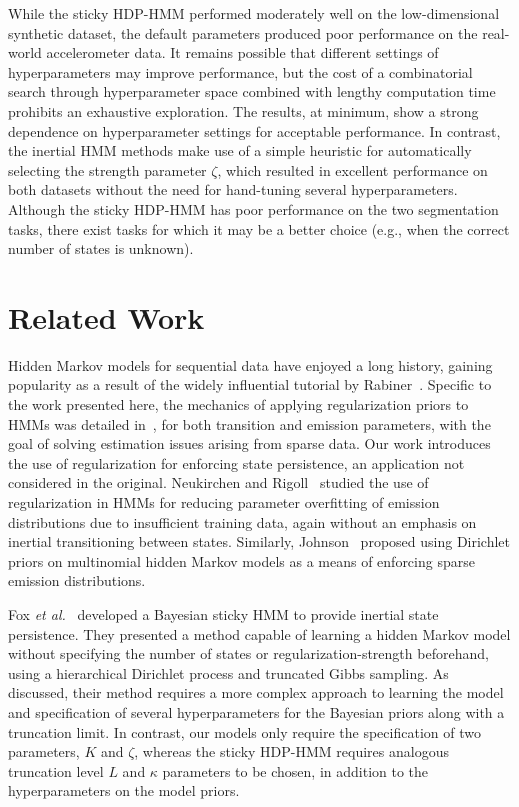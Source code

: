 \documentclass[letterpaper]{article}
\begin{document}
While the sticky HDP-HMM performed moderately well on the low-dimensional
synthetic dataset, the default parameters produced poor performance on the
real-world accelerometer data. It remains possible that different settings of
hyperparameters may improve performance, but the cost of a combinatorial search
through hyperparameter space combined with lengthy computation time prohibits an exhaustive 
exploration. The results, at minimum, show a strong dependence on hyperparameter settings for 
acceptable performance. In contrast, the inertial HMM methods make use of a simple heuristic for 
automatically selecting the strength parameter $\zeta$, which resulted in excellent performance on 
both datasets without the need for hand-tuning several hyperparameters. Although the sticky HDP-HMM 
has poor performance on the two segmentation tasks, there exist tasks for which it may be a better 
choice (e.g., when the correct number of states is unknown).

\section{Related Work}

Hidden Markov models for sequential data have enjoyed a long history, gaining
popularity as a result of the widely influential tutorial by
Rabiner~\cite{rabiner1989tutorial}. Specific to the work presented here, the mechanics of applying regularization priors 
to HMMs was detailed in~\cite{MAP1994}, for both transition and emission parameters, with the goal of 
solving estimation issues arising from sparse data. Our work introduces the use of regularization for 
enforcing state persistence, an application not considered in the original.
Neukirchen and Rigoll~\cite{neukirchen1999controlling} studied the use of
regularization in HMMs for reducing parameter overfitting of emission
distributions due to insufficient training data, again without an emphasis on
inertial transitioning between states. Similarly,
Johnson~\cite{Johnson07whydoesnt} proposed using Dirichlet priors on multinomial
hidden Markov models as a means of enforcing sparse emission distributions.

Fox \emph{et al.}\ \cite{fox2011sticky} developed a Bayesian sticky
HMM to provide inertial state persistence. They presented a method capable of
learning a hidden Markov model without specifying the number of states or
regularization-strength beforehand, using a hierarchical Dirichlet process and
truncated Gibbs sampling. As discussed, their method requires a more complex approach to
learning the model and specification of several hyperparameters for the Bayesian priors 
along with a truncation limit. In contrast, our models only require the 
specification of two parameters, $K$ and $\zeta$, whereas the
sticky HDP-HMM requires analogous truncation level $L$ and $\kappa$ parameters
to be chosen, in addition to the hyperparameters on the model priors. 
\end{document}
